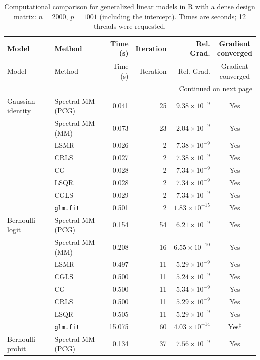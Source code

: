 \documentclass[10pt,a4paper]{article}
\begin{document}
\clearpage
\begingroup
\small
\setlength{\tabcolsep}{4pt}
\begin{longtable}{llrrrc}
\caption{Computational comparison for generalized linear models in R with a dense design matrix: $n=2000$, $p=1001$ (including the intercept). Times are seconds; 12 threads were requested.}
\label{tab:R-dense-glm-initial}\\
\toprule
Model & Method & Time (s) & Iteration & Rel. Grad. & \shortstack{Gradient\\converged} \\
\midrule
\endfirsthead
\toprule
Model & Method & Time (s) & Iteration & Rel. Grad. & \shortstack{Gradient\\converged} \\
\midrule
\endhead
\midrule
\multicolumn{6}{r}{Continued on next page}\\
\endfoot
\bottomrule
\endlastfoot
Gaussian-identity & Spectral-MM (PCG) & 0.041 & 25 & $9.38\times10^{-9}$ & Yes \\
 & Spectral-MM (MM) & 0.073 & 23 & $2.04\times10^{-9}$ & Yes \\
 & LSMR & 0.026 & 2 & $7.38\times10^{-9}$ & Yes \\
 & CRLS & 0.027 & 2 & $7.38\times10^{-9}$ & Yes \\
 & CG & 0.028 & 2 & $7.34\times10^{-9}$ & Yes \\
 & LSQR & 0.028 & 2 & $7.34\times10^{-9}$ & Yes \\
 & CGLS & 0.029 & 2 & $7.34\times10^{-9}$ & Yes \\
 & \texttt{glm.fit} & 0.501 & 2 & $1.83\times10^{-15}$ & Yes \\
\midrule
Bernoulli-logit & Spectral-MM (PCG) & 0.154 & 54 & $6.21\times10^{-9}$ & Yes \\
 & Spectral-MM (MM) & 0.208 & 16 & $6.55\times10^{-10}$ & Yes \\
 & LSMR & 0.497 & 11 & $5.29\times10^{-9}$ & Yes \\
 & CGLS & 0.500 & 11 & $5.24\times10^{-9}$ & Yes \\
 & CG & 0.500 & 11 & $5.34\times10^{-9}$ & Yes \\
 & CRLS & 0.500 & 11 & $5.29\times10^{-9}$ & Yes \\
 & LSQR & 0.505 & 11 & $5.29\times10^{-9}$ & Yes \\
 & \texttt{glm.fit} & 15.075 & 60 & $4.03\times10^{-14}$ & Yes$^{\ddagger}$ \\
\midrule
Bernoulli-probit & Spectral-MM (PCG) & 0.134 & 37 & $7.56\times10^{-9}$ & Yes \\

\end{longtable}
\end{document}

